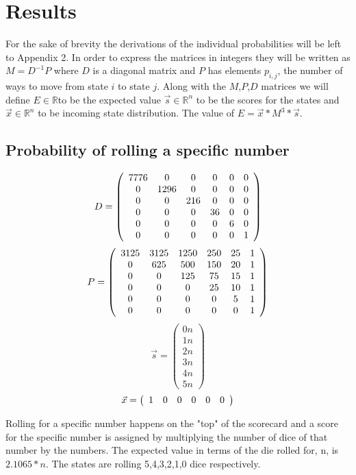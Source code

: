 \section{Results}

For the sake of brevity the derivations of the individual probabilities will be left to Appendix 2. In order to express the matrices in integers they will be written as $M=D^{-1}P$ where $D$ is a diagonal matrix and $P$ has elements $p_{i,j}$, the number of ways to move from state $i$ to state $j$. Along with the $M$,$P$,$D$ matrices we will define $E \in \mathbb{R}$to be the expected value $\vec{s} \in \mathbb{R}^n$ to be the scores for the states and $\vec{x} \in \mathbb{R}^n$ to be incoming state distribution. The value of $E=\vec{x}*M^3*\vec{s}$.



\subsection{Probability of rolling a specific number}
\[
D=
\left(
\begin{array}{c c c c c c}
7776 &0&0&0&0&0\\
0 & 1296&0&0&0&0\\
0 &0&216&0&0&0\\
0 &0&0&36&0&0\\
0 &0&0&0&6&0\\
0&0&0&0&0&1
\end{array}
\right)
\]
\[
P=
\left(
\begin{array}{c c c c c c}
3125 & 3125 & 1250 & 250 & 25 & 1\\
0 & 625 & 500 & 150 & 20 & 1\\
0 & 0 & 125 & 75 & 15 & 1\\
0 & 0 & 0 & 25 & 10 & 1\\
0 & 0 & 0 & 0 & 5 & 1\\
0 & 0 & 0 & 0 & 0 & 1
\end{array}
\right)
\]
\[
\vec{s}=
\left(
\begin{array}{c}
0n\\
1n\\
2n\\
3n\\
4n\\
5n
\end{array}
\right)
\]
\[
\vec{x}=
\left(
\begin{array}{c c c c c c}
1&0&0&0&0&0
\end{array}
\right)
\]

Rolling for a specific number happens on the "top" of the scorecard and a score for the specific number is assigned by multiplying the number of dice of that number by the numbers. The expected value in terms of the die rolled for, n, is $2.1065*n$. The states are rolling 5,4,3,2,1,0 dice respectively. 

